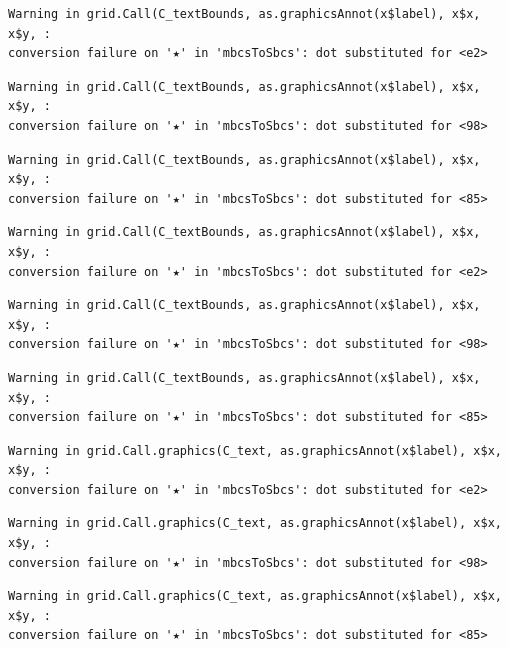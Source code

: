 \documentclass[
  letterpaper,
]{scrbook}
\begin{document}
\begin{verbatim}
Warning in grid.Call(C_textBounds, as.graphicsAnnot(x$label), x$x, x$y, :
conversion failure on '★' in 'mbcsToSbcs': dot substituted for <e2>
\end{verbatim}

\begin{verbatim}
Warning in grid.Call(C_textBounds, as.graphicsAnnot(x$label), x$x, x$y, :
conversion failure on '★' in 'mbcsToSbcs': dot substituted for <98>
\end{verbatim}

\begin{verbatim}
Warning in grid.Call(C_textBounds, as.graphicsAnnot(x$label), x$x, x$y, :
conversion failure on '★' in 'mbcsToSbcs': dot substituted for <85>
\end{verbatim}

\begin{verbatim}
Warning in grid.Call(C_textBounds, as.graphicsAnnot(x$label), x$x, x$y, :
conversion failure on '★' in 'mbcsToSbcs': dot substituted for <e2>
\end{verbatim}

\begin{verbatim}
Warning in grid.Call(C_textBounds, as.graphicsAnnot(x$label), x$x, x$y, :
conversion failure on '★' in 'mbcsToSbcs': dot substituted for <98>
\end{verbatim}

\begin{verbatim}
Warning in grid.Call(C_textBounds, as.graphicsAnnot(x$label), x$x, x$y, :
conversion failure on '★' in 'mbcsToSbcs': dot substituted for <85>
\end{verbatim}

\begin{verbatim}
Warning in grid.Call.graphics(C_text, as.graphicsAnnot(x$label), x$x, x$y, :
conversion failure on '★' in 'mbcsToSbcs': dot substituted for <e2>
\end{verbatim}

\begin{verbatim}
Warning in grid.Call.graphics(C_text, as.graphicsAnnot(x$label), x$x, x$y, :
conversion failure on '★' in 'mbcsToSbcs': dot substituted for <98>
\end{verbatim}

\begin{verbatim}
Warning in grid.Call.graphics(C_text, as.graphicsAnnot(x$label), x$x, x$y, :
conversion failure on '★' in 'mbcsToSbcs': dot substituted for <85>
\end{verbatim}
\end{document}
